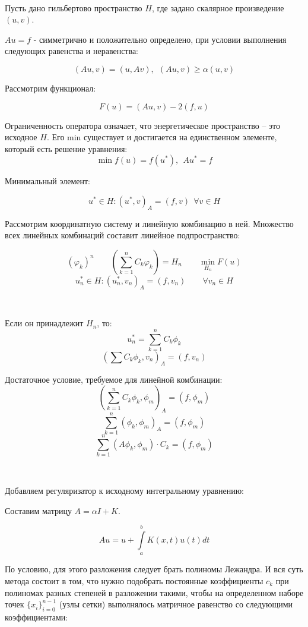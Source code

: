 \documentclass[12pt,a4paper]{article}
\begin{document}
\

Пусть дано гильбертово пространство $H$, где задано скалярное произведение $(u,v)$.

$Au=f$ - симметрично и положительно определено, при условии выполнения следующих равенства и неравенства:

$$(Au,v) = (u,Av), \ \ (Au,v) \geq \alpha(u,v)$$

Рассмотрим функционал:
 
$$F(u) = (Au,v)-2(f,u)$$

Ограниченность оператора означает, что энергетическое пространство -- это исходное $H$. Его min существует и достигается на единственном элементе, который есть решение уравнения:\\

$$\min f(u) = f(u^*), \ \ Au^*=f$$

Минимальный элемент:

$$u^* \in H: (u^*,v)_A = (f,v) \ \ \forall v \in H$$


Рассмотрим координатную систему и линейную комбинацию в ней. Множество всех линейных комбинаций составит линейное подпространство:

$$ \left( \varphi_k \right)^n \qquad \left({\sum\limits_{k=1}^n C_k \varphi_k} \right)= H_n \qquad \min_{H_n} F(u)$$
$$u^*_n \in H: (u^*_n,v_n)_A = (f,v_n)  \qquad \forall v_n \in H$$

\

Если он принадлежит $H_n$, то:
$$u^*_n = {\sum\limits_{k=1}^n C_k \phi_k}$$
$$\left( {\sum C_k \phi_k}, v_n\right)_A = \left( f, v_n \right)$$

Достаточное условие, требуемое для линейной комбинации:
$$ \left({\sum\limits_{k=1}^n C_k \phi_k}, \phi_m \right)_A =  \left( f, \phi_m \right)$$
$$ {\sum\limits_{k=1}^n (\phi_k, \phi_m)_A} = (f, \phi_m)$$
$${\sum\limits_{k=1}^n (A\phi_k,\phi_m)}\cdot C_k = (f, \phi_m)$$

\

Добавляем регуляризатор к исходному интегральному уравнению:

Составим матрицу $A = \alpha I + K$.

$$Au = u +\int\limits_a^b K(x,t)u(t)dt$$

По условию, для этого разложения следует брать полиномы Лежандра. И вся суть метода состоит в том, что нужно подобрать постоянные коэффициенты $c_k$ при полиномах разных степеней в разложении такими, чтобы на определенном наборе точек $\{ x_i \}_{i=0}^{n-1}$ (узлы сетки) выполнялось матричное равенство со следующими коэффициентами:
\end{document}
